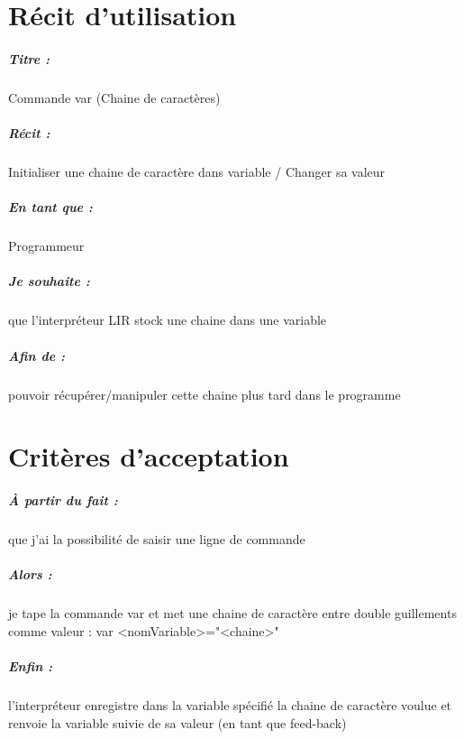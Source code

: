 \documentclass[12pt,a5paper, notitle, oneside]{report}
\begin{document}
    \chapter*{Récit d'utilisation}

    \paragraph{Titre : } Commande var (Chaine de caractères)
    \paragraph{Récit : }  Initialiser une chaine de caractère dans variable / Changer sa valeur
    \paragraph{En tant que : } Programmeur
    \paragraph{Je souhaite : } que l'interpréteur LIR stock une chaine dans une variable
    \paragraph{Afin de : } pouvoir récupérer/manipuler cette chaine plus tard dans le programme
    \newpage

    \chapter*{Critères d'acceptation}

    \paragraph{À partir du fait : } que j'ai la possibilité de saisir une ligne de commande
    \paragraph{Alors : } je tape la commande var et met une chaine de caractère entre double guillements comme valeur : var <nomVariable>="<chaine>"
    \paragraph{Enfin : } l'interpréteur enregistre dans la variable spécifié la chaine de caractère voulue et renvoie la variable suivie de sa valeur (en tant que feed-back)
\end{document}
